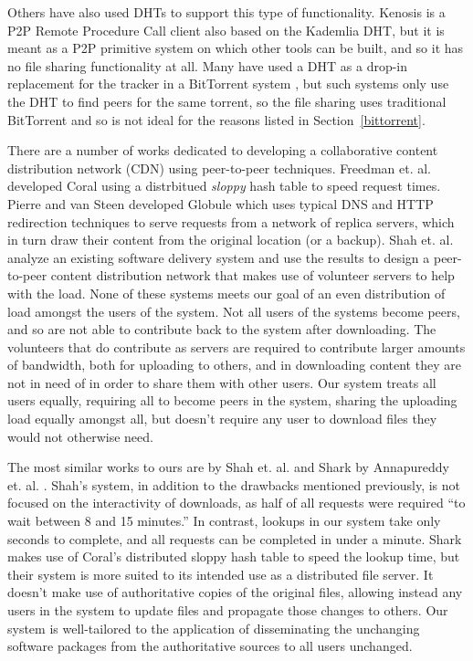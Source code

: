 \documentclass[conference]{IEEEtran}
\begin{document}
Others have also used DHTs to support this type of functionality.
Kenosis \cite{kenosis} is a P2P Remote Procedure Call
client also based on the Kademlia DHT, but it is meant as a P2P
primitive system on which other tools can be built, and so it has no
file sharing functionality at all. Many have used a DHT as a drop-in
replacement for the tracker in a BitTorrent system
\cite{bittorrent-dht, azureus-dht}, but such systems only use the
DHT to find peers for the same torrent, so the file sharing uses
traditional BitTorrent and so is not ideal for the reasons listed
in Section~\ref{bittorrent}.


There are a number of works dedicated to developing a collaborative
content distribution network (CDN) using peer-to-peer techniques.
Freedman et. al. developed Coral \cite{coral} using a distrbitued
\emph{sloppy} hash table to speed request times. Pierre and van
Steen developed Globule \cite{globule} which uses typical DNS and
HTTP redirection techniques to serve requests from a network of
replica servers, which in turn draw their content from the original
location (or a backup). Shah et. al. \cite{shah08} analyze an
existing software delivery system and use the results to design a
peer-to-peer content distribution network that makes use of
volunteer servers to help with the load. None of these systems meets
our goal of an even distribution of load amongst the users of the
system. Not all users of the systems become peers, and so are not
able to contribute back to the system after downloading. The
volunteers that do contribute as servers are required to contribute
larger amounts of bandwidth, both for uploading to others, and in
downloading content they are not in need of in order to share them
with other users. Our system treats all users equally, requiring all
to become peers in the system, sharing the uploading load equally
amongst all, but doesn't require any user to download files they
would not otherwise need.

The most similar works to ours are by Shah et. al. \cite{shah08} and
Shark by Annapureddy et. al. \cite{shark}.
Shah's system, in addition to the drawbacks mentioned previously,
is not focused on the interactivity of downloads, as
half of all requests were required ``to wait between 8 and 15
minutes.'' In contrast, lookups in our system take only seconds to
complete, and all requests can be completed in under a minute.
Shark makes use of Coral's distributed sloppy hash table to speed
the lookup time, but their system is more suited to its intended use
as a distributed file server. It doesn't make use of authoritative
copies of the original files, allowing instead any users in the
system to update files and propagate those changes to others. Our
system is well-tailored to the application of disseminating the
unchanging software packages from the authoritative sources to all
users unchanged.
\end{document}
